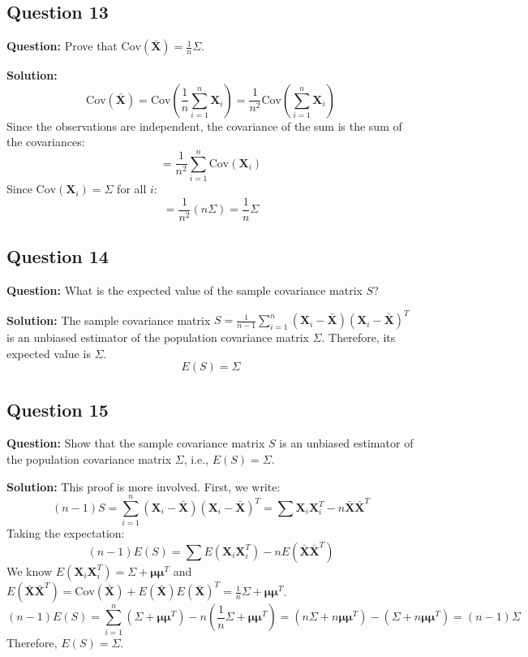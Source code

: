 \subsection*{Question 13}
\textbf{Question:} Prove that $\text{Cov}(\bar{\mathbf{X}}) = \frac{1}{n}\Sigma$.

\textbf{Solution:}
$$ \text{Cov}(\bar{\mathbf{X}}) = \text{Cov}\left(\frac{1}{n}\sum_{i=1}^n \mathbf{X}_i\right) = \frac{1}{n^2} \text{Cov}\left(\sum_{i=1}^n \mathbf{X}_i\right) $$
Since the observations are independent, the covariance of the sum is the sum of the covariances:
$$ = \frac{1}{n^2} \sum_{i=1}^n \text{Cov}(\mathbf{X}_i) $$
Since $\text{Cov}(\mathbf{X}_i) = \Sigma$ for all $i$:
$$ = \frac{1}{n^2} (n\Sigma) = \frac{1}{n}\Sigma $$

\subsection*{Question 14}
\textbf{Question:} What is the expected value of the sample covariance matrix $S$?

\textbf{Solution:}
The sample covariance matrix $S = \frac{1}{n-1} \sum_{i=1}^n (\mathbf{X}_i - \bar{\mathbf{X}})(\mathbf{X}_i - \bar{\mathbf{X}})^T$ is an unbiased estimator of the population covariance matrix $\Sigma$. Therefore, its expected value is $\Sigma$.
$$ E(S) = \Sigma $$

\subsection*{Question 15}
\textbf{Question:} Show that the sample covariance matrix $S$ is an unbiased estimator of the population covariance matrix $\Sigma$, i.e., $E(S) = \Sigma$.

\textbf{Solution:}
This proof is more involved. First, we write:
$$ (n-1)S = \sum_{i=1}^n (\mathbf{X}_i - \bar{\mathbf{X}})(\mathbf{X}_i - \bar{\mathbf{X}})^T = \sum \mathbf{X}_i\mathbf{X}_i^T - n\bar{\mathbf{X}}\bar{\mathbf{X}}^T $$
Taking the expectation:
$$ (n-1)E(S) = \sum E(\mathbf{X}_i\mathbf{X}_i^T) - nE(\bar{\mathbf{X}}\bar{\mathbf{X}}^T) $$
We know $E(\mathbf{X}_i\mathbf{X}_i^T) = \Sigma + \boldsymbol{\mu}\boldsymbol{\mu}^T$ and $E(\bar{\mathbf{X}}\bar{\mathbf{X}}^T) = \text{Cov}(\bar{\mathbf{X}}) + E(\bar{\mathbf{X}})E(\bar{\mathbf{X}})^T = \frac{1}{n}\Sigma + \boldsymbol{\mu}\boldsymbol{\mu}^T$.
$$ (n-1)E(S) = \sum_{i=1}^n (\Sigma + \boldsymbol{\mu}\boldsymbol{\mu}^T) - n(\frac{1}{n}\Sigma + \boldsymbol{\mu}\boldsymbol{\mu}^T) = (n\Sigma + n\boldsymbol{\mu}\boldsymbol{\mu}^T) - (\Sigma + n\boldsymbol{\mu}\boldsymbol{\mu}^T) = (n-1)\Sigma $$
Therefore, $E(S) = \Sigma$.

